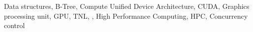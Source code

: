 Data structures, B-Tree, Compute Unified Device Architecture, CUDA, Graphics processing unit, GPU, TNL, \CC, High Performance Computing, HPC, Concurrency control